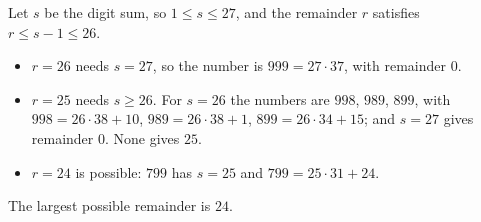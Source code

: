 Let $s$ be the digit sum, so $1\le s\le27$, and the remainder $r$ satisfies $r\le s-1\le26$.
\begin{itemize}
\item $r=26$ needs $s=27$, so the number is $999=27\cdot37$, with remainder $0$.
\item $r=25$ needs $s\ge26$. For $s=26$ the numbers are $998$, $989$, $899$, with $998=26\cdot38+10$, $989=26\cdot38+1$, $899=26\cdot34+15$; and $s=27$ gives remainder $0$. None gives $25$.
\item $r=24$ is possible: $799$ has $s=25$ and $799=25\cdot31+24$.
\end{itemize}
The largest possible remainder is $\boxed{24}$.
